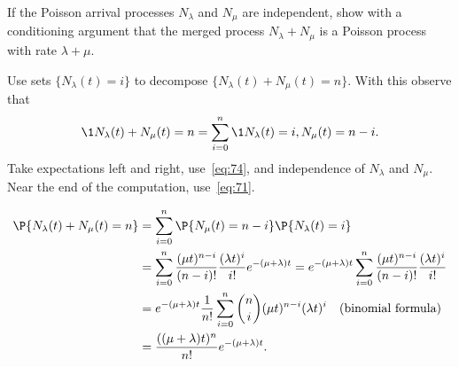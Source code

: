 \begin{exercise}\label{ex:l-103}
If the Poisson arrival processes $N_\lambda$ and $N_\mu$ are independent, show with a conditioning argument that
the merged process $N_\lambda + N_\mu$ is a Poisson process with rate $\lambda + \mu$.
\begin{hint}
 Use sets $\{N_\lambda(t) = i\}$ to decompose $\{N_\lambda(t) + N_\mu(t) = n\}$. With this observe that
 \begin{equation*}
 \1{N_\lambda(t) + N_\mu(t) = n} =
 \sum_{i=0}^n \1{N_\lambda(t)=i, N_\mu(t) = n-i}.
 \end{equation*}
Take expectations left and right, use~\cref{eq:74}, and independence of $N_\lambda$ and $N_\mu$. Near the end of the computation, use~\cref{eq:71}.
\end{hint}
\begin{solution}
\begin{align*}
\P{N_\lambda(t) + N_\mu(t) = n}
&= \sum_{i=0}^n \P{N_\mu(t) = n-i}\P{N_\lambda(t)=i} \\
&= \sum_{i=0}^n \frac{(\mu t)^{n-i}}{(n-i)!} \frac{(\lambda t)^i}{i!} e^{-(\mu+\lambda)t}
= e^{-(\mu+\lambda)t} \sum_{i=0}^n \frac{(\mu t)^{n-i}}{(n-i)!} \frac{(\lambda t)^i}{i!} \\
&= e^{-(\mu+\lambda)t}\frac 1{n!} \sum_{i=0}^n {n \choose i }(\mu t)^{n-i}(\lambda t)^i \quad\text{(binomial formula)} \\
&= \frac{((\mu+\lambda)t)^n}{n!}e^{-(\mu+\lambda)t}.
 \end{align*}
\end{solution}
\end{exercise}


